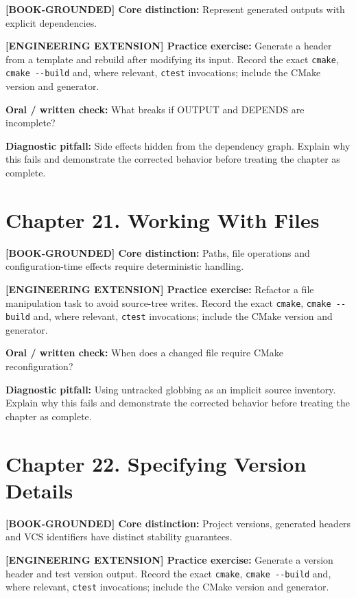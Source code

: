 \documentclass[11pt,letterpaper,oneside]{report}
\providecommand{\passthrough}[1]{#1}
\begin{document}
\textbf{{[}BOOK-GROUNDED{]} Core distinction:} Represent generated
outputs with explicit dependencies.

\textbf{{[}ENGINEERING EXTENSION{]} Practice exercise:} Generate a
header from a template and rebuild after modifying its input. Record the
exact \passthrough{\lstinline!cmake!},
\passthrough{\lstinline!cmake --build!} and, where relevant,
\passthrough{\lstinline!ctest!} invocations; include the CMake version
and generator.

\textbf{Oral / written check:} What breaks if OUTPUT and DEPENDS are
incomplete?

\textbf{Diagnostic pitfall:} Side effects hidden from the dependency
graph. Explain why this fails and demonstrate the corrected behavior
before treating the chapter as complete.

\section{Chapter 21. Working With
Files}\label{chapter-21.-working-with-files}

\textbf{{[}BOOK-GROUNDED{]} Core distinction:} Paths, file operations
and configuration-time effects require deterministic handling.

\textbf{{[}ENGINEERING EXTENSION{]} Practice exercise:} Refactor a file
manipulation task to avoid source-tree writes. Record the exact
\passthrough{\lstinline!cmake!}, \passthrough{\lstinline!cmake --build!}
and, where relevant, \passthrough{\lstinline!ctest!} invocations;
include the CMake version and generator.

\textbf{Oral / written check:} When does a changed file require CMake
reconfiguration?

\textbf{Diagnostic pitfall:} Using untracked globbing as an implicit
source inventory. Explain why this fails and demonstrate the corrected
behavior before treating the chapter as complete.

\section{Chapter 22. Specifying Version
Details}\label{chapter-22.-specifying-version-details}

\textbf{{[}BOOK-GROUNDED{]} Core distinction:} Project versions,
generated headers and VCS identifiers have distinct stability
guarantees.

\textbf{{[}ENGINEERING EXTENSION{]} Practice exercise:} Generate a
version header and test version output. Record the exact
\passthrough{\lstinline!cmake!}, \passthrough{\lstinline!cmake --build!}
and, where relevant, \passthrough{\lstinline!ctest!} invocations;
include the CMake version and generator.
\end{document}
